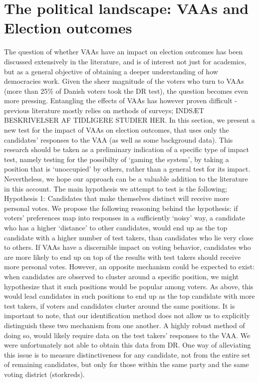 \section{The political landscape: VAAs and Election outcomes}
The question of whether VAAs have an impact on election outcomes has been discussed extensively in the literature, and is of interest not just for academics, but as a general objective of obtaining a deeper understanding of how democracies work. Given the sheer magnitude of the voters who turn to VAAs (more than 25\% of Danish voters took the DR test), the question becomes even more pressing. Entangling the effects of VAAs has however proven difficult - previous literature mostly relies on methods of surveys; INDSÆT BESKRIVELSER AF TIDLIGERE STUDIER HER.
In this section, we present a new test for the impact of VAAs on election outcomes, that uses only the candidates’ responses to the VAA (as well as some background data). This research should be taken as a preliminary indication of a specific type of impact test, namely testing for the possibilty of ‘gaming the system’, by taking a position that is ‘unoccupied’ by others, rather than a general test for its impact. Nevertheless, we hope our approach can be a valuable addition to the literature in this account. The main hypothesis we attempt to test is the following;
Hypothesis 1:
Candidates that make themselves distinct will receive more personal votes. 
We propose the following reasoning behind the hypothesis: if voters’ preferences map into responses in a sufficiently ‘noisy’ way, a candidate who has a higher ‘distance’ to other candidates, would end up as the top candidate with a higher number of test takers, than candidates who lie very close to others. If VAAs have a discernible impact on voting behavior, candidates who are more likely to end up on top of the results with test takers should receive more personal votes. 
However, an opposite mechanism could be expected to exist: when candidates are observed to cluster around a specific position, we might hypothesize that it such positions would be popular among voters. As above, this would lead candidates in such positions to end up as the top candidate with more test takers, if voters and candidates cluster around the same positions. 
It is important to note, that our identification method does not allow us to explicitly distinguish these two mechanism from one another. A highly robust method of doing so, would likely require data on the test takers’ responses to the VAA. We were unfortunately not able to obtain this data from DR. One way of alleviating this issue is to measure distinctiveness for any candidate, not from the entire set of remaining candidates, but only for those within the same party and the same voting district (storkreds). 

